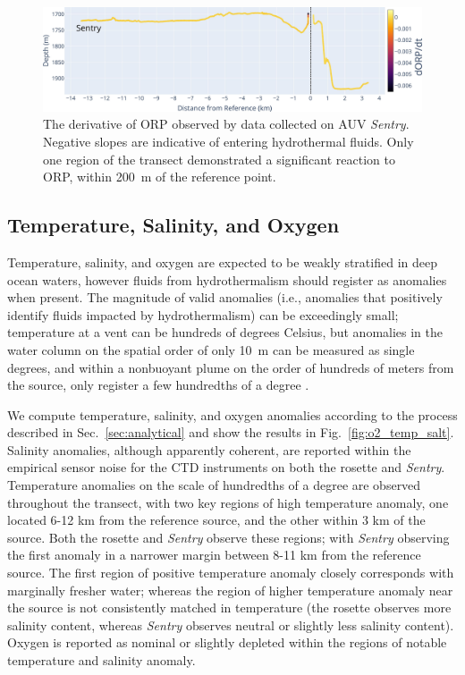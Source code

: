 \begin{figure}[h!]
    \centering
    \includegraphics[width=\columnwidth]{figures/chap3_orp_over_distance.jpg}
    \caption{The derivative of ORP observed by data collected on AUV \emph{Sentry}. Negative slopes are indicative of entering hydrothermal fluids. Only one region of the transect demonstrated a significant reaction to ORP, within \SI{200}{\meter} of the reference point.}
    \label{fig:orp_distance}
\end{figure}

\subsection{Temperature, Salinity, and Oxygen}
\label{sec:o2_temp_salt}
Temperature, salinity, and oxygen are expected to be weakly stratified in deep ocean waters, however fluids from hydrothermalism should register as anomalies when present. The magnitude of valid anomalies (i.e., anomalies that positively identify fluids impacted by hydrothermalism) can be exceedingly small; temperature at a vent can be hundreds of degrees Celsius, but anomalies in the water column on the spatial order of only \SI{10}{\meter} can be measured as single degrees, and within a nonbuoyant plume on the order of hundreds of meters from the source, only register a few hundredths of a degree \cite{yoerger2007autonomous}. 

We compute temperature, salinity, and oxygen anomalies according to the process described in Sec.~\ref{sec:analytical} and show the results in Fig.~\ref{fig:o2_temp_salt}. Salinity anomalies, although apparently coherent, are reported within the empirical sensor noise for the CTD instruments on both the rosette and \emph{Sentry}. Temperature anomalies on the scale of hundredths of a degree are observed throughout the transect, with two key regions of high temperature anomaly, one located 6-12 km from the reference source, and the other within 3 km of the source. Both the rosette and \emph{Sentry} observe these regions; with \emph{Sentry} observing the first anomaly in a narrower margin between 8-11 km from the reference source. The first region of positive temperature anomaly closely corresponds with marginally fresher water; whereas the region of higher temperature anomaly near the source is not consistently matched in temperature (the rosette observes more salinity content, whereas \emph{Sentry} observes neutral or slightly less salinity content). Oxygen is reported as nominal or slightly depleted within the regions of notable temperature and salinity anomaly.

